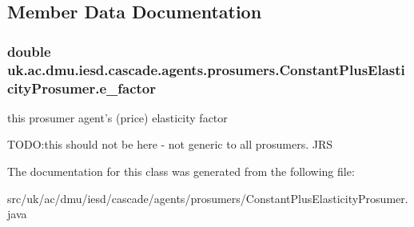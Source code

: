 \subsection{Member Data Documentation}
\hypertarget{classuk_1_1ac_1_1dmu_1_1iesd_1_1cascade_1_1agents_1_1prosumers_1_1_constant_plus_elasticity_prosumer_abd03989c676507a04118e4a0a67bfbc2}{
\subsubsection[{e\-\_\-factor}]{\setlength{\rightskip}{0pt plus 5cm}double uk.\-ac.\-dmu.\-iesd.\-cascade.\-agents.\-prosumers.\-Constant\-Plus\-Elasticity\-Prosumer.\-e\-\_\-factor\hspace{0.3cm}{\ttfamily [protected]}}}\label{classuk_1_1ac_1_1dmu_1_1iesd_1_1cascade_1_1agents_1_1prosumers_1_1_constant_plus_elasticity_prosumer_abd03989c676507a04118e4a0a67bfbc2}


this prosumer agent's (price) elasticity factor 

T\-O\-D\-O\-:this should not be here -\/ not generic to all prosumers. J\-R\-S 

The documentation for this class was generated from the following file\-:\begin{DoxyCompactItemize}
\item 
src/uk/ac/dmu/iesd/cascade/agents/prosumers/Constant\-Plus\-Elasticity\-Prosumer.\-java\end{DoxyCompactItemize}
